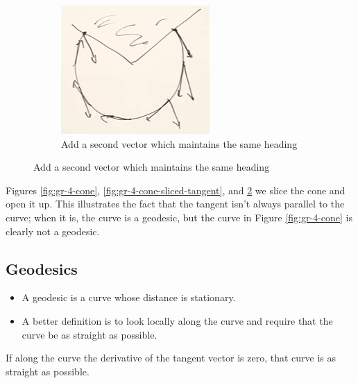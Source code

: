 \documentclass[]{article}
\begin{document}
{\begin{figure}[H]
\begin{center}
\begin{subfigure}[t]{0.3\textwidth}
		\end{subfigure}
		\;
		\begin{subfigure}[t]{0.3\textwidth}
			\caption{Add a second vector which maintains the same heading}\label{fig:gr-4-cone-sliced}
			\includegraphics[width=\textwidth]{gr-4-cone-sliced}
		\end{subfigure}
	\end{center}
\end{figure}

 
Figures \ref{fig:gr-4-cone}, \ref{fig:gr-4-cone-sliced-tangent}, and \ref{fig:gr-4-cone-sliced} we slice the cone and open it up. This illustrates the fact that the tangent isn't always parallel to the curve; when it is, the curve is a geodesic, but the curve in Figure \ref{fig:gr-4-cone} is clearly not a geodesic.

\subsection{Geodesics} 

\begin{itemize}
	\item 	A geodesic is a curve whose distance is stationary.
	\item A better definition is to look locally along the curve and require that the curve be as straight as possible.
\end{itemize}

If along the curve the derivative of the tangent vector is zero, that curve is as straight as possible.

}
\end{document}
